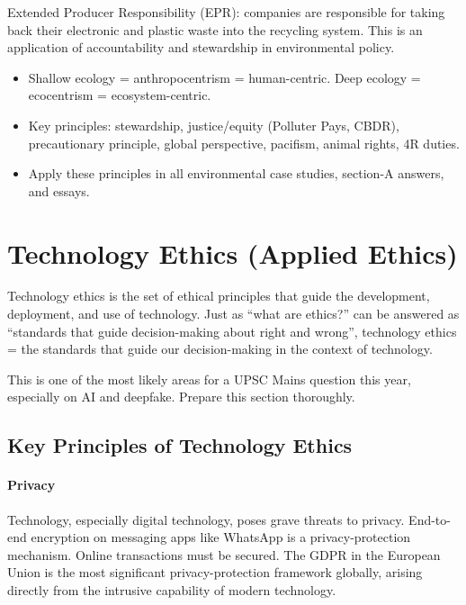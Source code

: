 \begin{GovtPolicy}
Extended Producer Responsibility (EPR): companies are responsible for taking back their electronic and plastic waste into the recycling system. This is an application of accountability and stewardship in environmental policy.
\end{GovtPolicy}

\begin{QuickRevision}
\begin{itemize}
\item Shallow ecology = anthropocentrism = human-centric. Deep ecology = ecocentrism = ecosystem-centric.
\item Key principles: stewardship, justice/equity (Polluter Pays, CBDR), precautionary principle, global perspective, pacifism, animal rights, 4R duties.
\item Apply these principles in all environmental case studies, section-A answers, and essays.
\end{itemize}
\end{QuickRevision}

\section{Technology Ethics (Applied Ethics)}

Technology ethics is the set of ethical principles that guide the development, deployment, and use of technology. Just as ``what are ethics?'' can be answered as ``standards that guide decision-making about right and wrong'', technology ethics = the standards that guide our decision-making in the context of technology.

\begin{CriticalPoint}
This is one of the most likely areas for a UPSC Mains question this year, especially on AI and deepfake. Prepare this section thoroughly.
\end{CriticalPoint}

\subsection{Key Principles of Technology Ethics}

\paragraph{Privacy} Technology, especially digital technology, poses grave threats to privacy. End-to-end encryption on messaging apps like WhatsApp is a privacy-protection mechanism. Online transactions must be secured. The GDPR in the European Union is the most significant privacy-protection framework globally, arising directly from the intrusive capability of modern technology.

